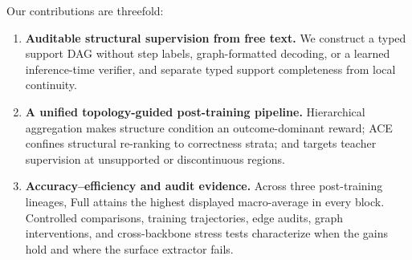 Our contributions are threefold:
\begin{enumerate}[leftmargin=*,itemsep=2pt]
\item \textbf{Auditable structural supervision from free text.} We construct a typed support DAG without step labels, graph-formatted decoding, or a learned inference-time verifier, and separate typed support completeness from local continuity.

\item \textbf{A unified topology-guided post-training pipeline.} Hierarchical aggregation makes structure condition an outcome-dominant reward; ACE confines structural re-ranking to correctness strata; and \tgd targets teacher supervision at unsupported or discontinuous regions.

\item \textbf{Accuracy--efficiency and audit evidence.} Across three post-training lineages, Full attains the highest displayed macro-average in every block. Controlled comparisons, training trajectories, edge audits, graph interventions, and cross-backbone stress tests characterize when the gains hold and where the surface extractor fails.
\end{enumerate}
